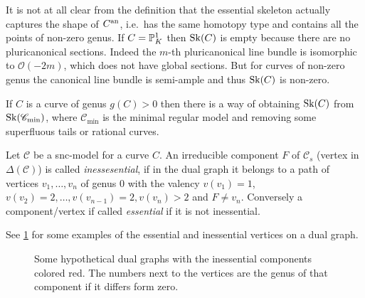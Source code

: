 It is not at all clear from the definition that the essential skeleton actually captures the shape of $C{}^{\text{an}}$, i.e.\ has the same homotopy type and contains all the points of non-zero genus. 
If $C = \mathbb{P}^{1}_K$ then $\operatorname{Sk}(C)$ is empty because there are no pluricanonical sections. Indeed the $m$-th pluricanonical line bundle is isomorphic to  $\mathcal{O}(-2m)$, which does not have global sections. 
But for curves of non-zero genus the canonical line bundle is semi-ample and thus $\operatorname{Sk}(C)$ is non-zero. 

If $C$ is a curve of genus $g(C) > 0$ then there is a way of obtaining $\operatorname{Sk}(C)$ from $\operatorname{Sk}(\mathscr C_\text{min} )$, where $\mathscr C _\text{min}$ is the minimal regular model and removing some superfluous tails or rational curves.  

\begin{definition}
	Let $\mathscr C$ be a snc-model for a curve $C$. 
	An irreducible component $F$ of $\mathscr C_s$ (vertex in $\Delta(\mathscr C)$) is called \emph{inessesential}, if in the dual graph it belongs to a path of vertices $v_1, \ldots, v_n$ of genus $0$ with the valency $v(v_1) = 1$, $v(v_{2}) = 2, \ldots, v(v_{n-1}) = 2, v(v_n) > 2$ and $F \ne v_n$. 
	Conversely a component/vertex if called \emph{essential} if it is not inessential. 
\end{definition}
See \cref{fig:inessential_components} for some examples of the essential and inessential vertices on a dual graph. 

\begin{figure}[h]
    \centering
    \caption{Some hypothetical dual graphs with the inessential components colored red. 
    The numbers next to the vertices are the genus of that component if it differs form zero.}
    \label{fig:inessential_components}
\end{figure}

